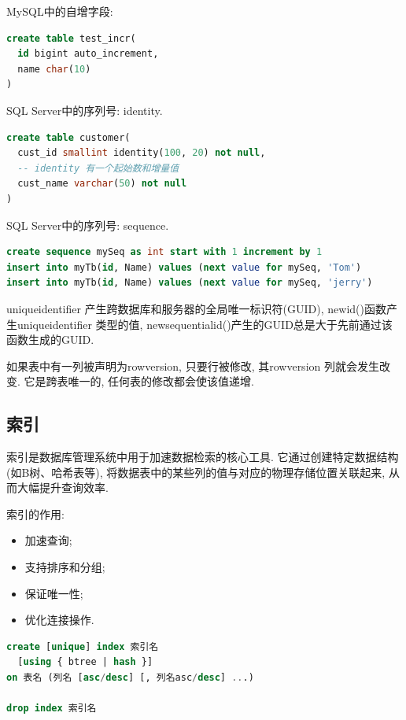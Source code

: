 MySQL中的自增字段:
\begin{lstlisting}[language=SQL]
create table test_incr(
  id bigint auto_increment,
  name char(10)
)
\end{lstlisting}

SQL Server中的序列号: identity.
\begin{lstlisting}[language=SQL]
create table customer(
  cust_id smallint identity(100, 20) not null,
  -- identity 有一个起始数和增量值
  cust_name varchar(50) not null
)
\end{lstlisting}

SQL Server中的序列号: sequence.
\begin{lstlisting}[language=SQL]
create sequence mySeq as int start with 1 increment by 1
insert into myTb(id, Name) values (next value for mySeq, 'Tom')
insert into myTb(id, Name) values (next value for mySeq, 'jerry')
\end{lstlisting}

uniqueidentifier 产生跨数据库和服务器的全局唯一标识符(GUID), newid()函数产生uniqueidentifier 类型的值, newsequentialid()产生的GUID总是大于先前通过该函数生成的GUID.

如果表中有一列被声明为rowversion, 只要行被修改, 其rowversion
列就会发生改变. 它是跨表唯一的, 任何表的修改都会使该值递增.

\subsection{索引}

\begin{definition}[索引]
  索引是数据库管理系统中用于加速数据检索的核心工具. 
  它通过创建特定数据结构(如B树、哈希表等), 
  将数据表中的某些列的值与对应的物理存储位置关联起来, 从而大幅提升查询效率.
\end{definition}

索引的作用:
\begin{itemize}
  \item 加速查询;
  \item 支持排序和分组;
  \item 保证唯一性;
  \item 优化连接操作.
\end{itemize}

\begin{lstlisting}[language=SQL]
create [unique] index 索引名
  [using { btree | hash }]
on 表名 (列名 [asc/desc] [, 列名asc/desc] ...)

drop index 索引名
\end{lstlisting}

